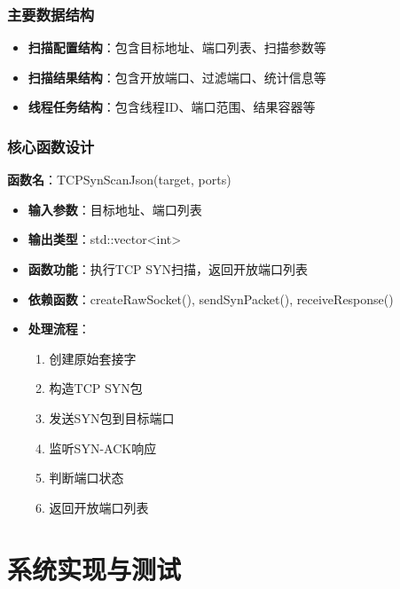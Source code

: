 \documentclass[12pt,hyperref,a4paper,UTF8]{ctexart}
\begin{document}
\subsubsection{主要数据结构}
\begin{itemize}
    \item \textbf{扫描配置结构}：包含目标地址、端口列表、扫描参数等
    \item \textbf{扫描结果结构}：包含开放端口、过滤端口、统计信息等
    \item \textbf{线程任务结构}：包含线程ID、端口范围、结果容器等
\end{itemize}

\subsubsection{核心函数设计}

\textbf{函数名}：TCPSynScanJson(target, ports)
\begin{itemize}
    \item \textbf{输入参数}：目标地址、端口列表
    \item \textbf{输出类型}：std::vector<int>
    \item \textbf{函数功能}：执行TCP SYN扫描，返回开放端口列表
    \item \textbf{依赖函数}：createRawSocket(), sendSynPacket(), receiveResponse()
    \item \textbf{处理流程}：
    \begin{enumerate}
        \item 创建原始套接字
        \item 构造TCP SYN包
        \item 发送SYN包到目标端口
        \item 监听SYN-ACK响应
        \item 判断端口状态
        \item 返回开放端口列表
    \end{enumerate}
\end{itemize}

\section{系统实现与测试}
\end{document}
